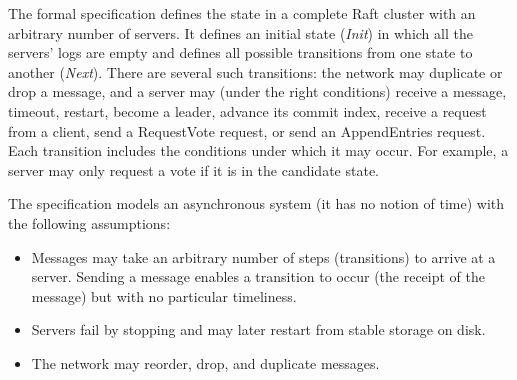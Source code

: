 The formal specification defines the state in a complete Raft cluster
with an arbitrary number of servers. It defines an initial state
(\emph{Init}) in which all the servers' logs are empty and defines all
possible transitions from one state to another (\emph{Next}). There are
several such transitions: the network may duplicate or drop a message,
and a server may (under the right conditions) receive a message,
timeout, restart, become a leader, advance its commit index, receive a
request from a client, send a RequestVote request, or send an
AppendEntries request. Each transition includes the conditions under
which it may occur. For example, a server may only request a vote if it
is in the candidate state.

The specification models an asynchronous system (it has no notion of
time) with the following assumptions:
%
\begin{itemize}
%
\item Messages may take an arbitrary number of steps (transitions) to
arrive at a server. Sending a message enables a transition to occur (the
receipt of the message) but with no particular timeliness.
%
\item Servers fail by stopping and may later restart from stable storage
on disk.
%
\item The network may reorder, drop, and duplicate messages.
%
\end{itemize}

